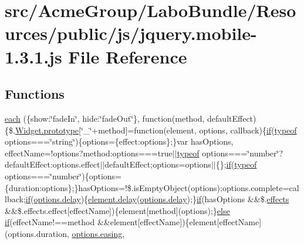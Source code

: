 \hypertarget{jquery_8mobile-1_83_81_8js}{\section{src/\+Acme\+Group/\+Labo\+Bundle/\+Resources/public/js/jquery.mobile-\/1.3.1.js File Reference}
\label{jquery_8mobile-1_83_81_8js}
}
\subsection*{Functions}
\begin{DoxyCompactItemize}
\item 
\hyperlink{jquery_8mobile-1_83_81_8js_ae1dde89fbcda3fabf0339b83918f7e08}{each} (\{show\+:\char`\"{}fade\+In\char`\"{}, hide\+:\char`\"{}fade\+Out\char`\"{}\}, function(method, default\+Effect)\{\$.\hyperlink{jquery_8mobile-1_83_81_8js_acd6098decfaf355a91ef27debf39295f}{Widget.\+prototype}\mbox{[}\char`\"{}\+\_\+\char`\"{}+method\mbox{]}=function(element, options, callback)\{\hyperlink{fullpage_2plugin_8js_a8b98017e64ef036adb9ae327ff94abe1}{if}(\hyperlink{extras_2_scroller_2media_2docs_2media_2js_2sh_brush_j_script_8js_a93a9266f92d6d68644e7aa63da3caa11}{typeof} options===\char`\"{}string\char`\"{})\{options=\{effect\+:options\};\}var has\+Options, effect\+Name=!options?method\+:options===true$\vert$$\vert$\hyperlink{extras_2_scroller_2media_2docs_2media_2js_2sh_brush_j_script_8js_a93a9266f92d6d68644e7aa63da3caa11}{typeof} options===\char`\"{}number\char`\"{}?default\+Effect\+:options.\+effect$\vert$$\vert$default\+Effect;options=options$\vert$$\vert$\{\};\hyperlink{fullpage_2plugin_8js_a8b98017e64ef036adb9ae327ff94abe1}{if}(\hyperlink{extras_2_scroller_2media_2docs_2media_2js_2sh_brush_j_script_8js_a93a9266f92d6d68644e7aa63da3caa11}{typeof} options===\char`\"{}number\char`\"{})\{options=\{duration\+:options\};\}has\+Options=!\$.is\+Empty\+Object(options);options.\+complete=callback;\hyperlink{fullpage_2plugin_8js_a8b98017e64ef036adb9ae327ff94abe1}{if}(\hyperlink{jquery_8mobile-1_83_81_8js_aa109bb8c15dd398a7b3059507518c06e}{options.\+delay})\{\hyperlink{jquery_8mobile-1_83_81_8js_aa109bb8c15dd398a7b3059507518c06e}{element.\+delay}(\hyperlink{jquery_8mobile-1_83_81_8js_aa109bb8c15dd398a7b3059507518c06e}{options.\+delay});\}\hyperlink{fullpage_2plugin_8js_a8b98017e64ef036adb9ae327ff94abe1}{if}(has\+Options \&\&\$.\hyperlink{jquery-ui_8js_abe03c7d844b7b73e46bb0e39497d47fc}{effects} \&\&\$.effects.\+effect\mbox{[}effect\+Name\mbox{]})\{element\mbox{[}method\mbox{]}(options);\}\hyperlink{jquery_8iframe-transport_8js_a0544c3fe466e421738dae463968b70ba}{else} \hyperlink{fullpage_2plugin_8js_a8b98017e64ef036adb9ae327ff94abe1}{if}(effect\+Name!==method \&\&element\mbox{[}effect\+Name\mbox{]})\{element\mbox{[}effect\+Name\mbox{]}(options.\+duration, \hyperlink{jquery-1_89_81_8js_a9758a312629fa6de1744280dd6e6253b}{options.\+easing}, 
\end{DoxyCompactItemize}
